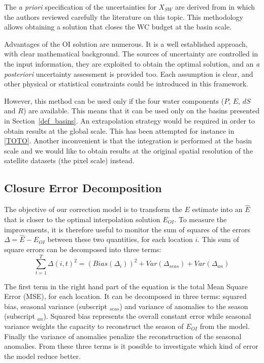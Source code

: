 \documentclass[draft]{agujournal2019}
\begin{document}
The {\it a priori} specification of the uncertainties for $X_{SW}$ are derived from \cite{Dorigo2021} in which the authors reviewed carefully the literature on this topic.
This methodology allows obtaining a solution that closes the WC budget at the basin scale.

Advantages of the OI solution are numerous. 
It is a well established approach, with clear mathematical background. 
The sources of uncertainty are controlled in the input information, they are exploited to obtain the optimal solution, and an {\it a posteriori} uncertainty assessment is provided too. 
Each assumption is clear, and other physical or statistical constraints could be introduced in this framework. 

However, this method can be used only if the four water components ($P$, $E$, $dS$ and $R$) are available. 
This means that it can be used only on the basins presented in Section~\ref{def_basins}. 
An extrapolation strategy would be required in order to obtain results at the global scale. 
This has been attempted for instance in \ref{TOTO}. 
Another inconvenient is that the integration is performed at the basin scale and 
we would like to obtain results at the original spatial resolution of the satellite datasets (the pixel scale) instead.

\subsection{Closure Error Decomposition}

The objective of our correction model is to transform the $E$ estimate into an $\hat E$ that is closer to the optimal interpolation solution $E_{OI}$. To measure the improvements, it is therefore useful to monitor the sum of squares of the errors $\Delta = \hat E - E_{OI}$ between these two quantities, for each location $i$.
This sum of square errors can be decomposed into three terms:
\begin{equation}
\sum_{t=1}^T {\Delta(i,t)}^2 =  \left(Bias\left(\Delta_i  \right) \right)^2 + Var\left( \Delta_{seas} \right) + Var\left( \Delta_{an} \right)
\end{equation}

The first term in the right hand part of the equation is the total Mean Square Error (MSE), for each location. 
It can be decomposed in three terms: squared bias, seasonal variance (subscript $_{seas}$) and variance of anomalies to the season (subscript $_{an}$).
 Squared bias represents the overall constant error while seasonal variance weights the capacity to reconstruct the season of $E_{OI}$ from the model. 
Finally the variance of anomalies penalize the reconstruction of the seasonal anomalies. 
From these three terms is it possible to investigate which kind of error the model reduce better.
\end{document}
